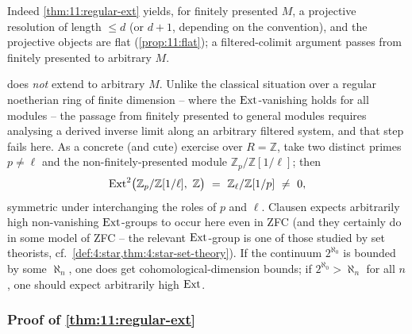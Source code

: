 Indeed \cref{thm:11:regular-ext} yields, for finitely presented $M$, a
projective resolution of length $\le d$ (or $d+1$, depending on the
convention), and the projective objects are flat (\cref{prop:11:flat}); a
filtered-colimit argument passes from finitely presented to arbitrary $M$.

\begin{remark}
\label{rmk:11:not-fp}
 does \emph{not} extend to arbitrary $M$. Unlike the
classical situation over a regular noetherian ring of finite dimension -- where
the $\operatorname{Ext}$-vanishing holds for all modules -- the passage from finitely
presented to general modules requires analysing a derived inverse limit along
an arbitrary filtered system, and that step fails here. As a concrete (and
cute) exercise over $R=\mathbb{Z}$, take two distinct primes $p\ne\ell$ and the
non-finitely-presented module $\mathbb{Z}_{p}/\mathbb{Z}[1/\ell]$; then
\begin{equation*}
\Ext^{2}\bigl(\mathbb{Z}_{p}/\mathbb{Z}[1/\ell],\ \mathbb{Z}\bigr)\ =\
\mathbb{Z}_{\ell}/\mathbb{Z}[1/p]\ \neq\ 0,
\end{equation*}
symmetric under interchanging the roles of $p$ and $\ell$. Clausen expects
arbitrarily high non-vanishing $\operatorname{Ext}$-groups to occur here even in ZFC (and
they certainly do in some model of ZFC -- the relevant $\operatorname{Ext}$-group is one of
those studied by set theorists, cf.\ \cref{def:4:star,thm:4:star-set-theory}).
If the continuum $2^{\aleph_{0}}$ is bounded by some $\aleph_{n}$, one does
get cohomological-dimension bounds; if $2^{\aleph_{0}}>\aleph_{n}$ for all $n$,
one should expect arbitrarily high $\operatorname{Ext}$.
\end{remark}

\subsubsection*{Proof of \texorpdfstring{\cref{thm:11:regular-ext}}{the theorem}}

